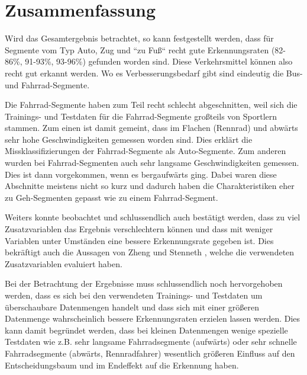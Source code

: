 \section{Zusammenfassung}
Wird das Gesamtergebnis betrachtet, so kann festgestellt werden, dass für Segmente vom Typ Auto, Zug und ``zu Fuß`` recht gute Erkennungsraten (82-86\%, 91-93\%, 93-96\%) gefunden worden sind. Diese Verkehrsmittel können also recht gut erkannt werden. Wo es Verbesserungsbedarf gibt sind eindeutig die Bus- und Fahrrad-Segmente.  

Die Fahrrad-Segmente haben zum Teil recht schlecht abgeschnitten, weil sich die Trainings- und Testdaten für die Fahrrad-Segmente großteils von Sportlern stammen. Zum einen ist damit gemeint, dass im Flachen (Rennrad) und abwärts sehr hohe Geschwindigkeiten gemessen worden sind. Dies erklärt die Missklassifizierungen der Fahrrad-Segmente als Auto-Segmente. Zum anderen wurden bei Fahrrad-Segmenten auch sehr langsame Geschwindigkeiten gemessen. Dies ist dann vorgekommen, wenn es bergaufwärts ging. Dabei waren diese Abschnitte meistens nicht so kurz und dadurch haben die Charakteristiken eher zu Geh-Segmenten gepasst wie zu einem Fahrrad-Segment.

Weiters konnte beobachtet und schlussendlich auch bestätigt werden, dass zu viel Zusatzvariablen das Ergebnis verschlechtern können und dass mit weniger Variablen unter Umständen eine bessere Erkennungsrate gegeben ist. Dies bekräftigt auch die Aussagen von Zheng \cite{zheng_understanding_2010} und Stenneth \cite{stenneth_transportation_2011}, welche die verwendeten Zusatzvariablen evaluiert haben. 

Bei der Betrachtung der Ergebnisse muss schlussendlich noch hervorgehoben werden, dass es sich bei den verwendeten Trainings- und Testdaten um überschaubare Datenmengen handelt und dass sich mit einer größeren Datenmenge wahrscheinlich bessere Erkennungsraten erzielen lassen werden. Dies kann damit begründet werden, dass bei kleinen Datenmengen wenige spezielle Testdaten wie z.B. sehr langsame Fahrradsegmente (aufwärts) oder sehr schnelle Fahrradsegmente (abwärts, Rennradfahrer) wesentlich größeren Einfluss auf den Entscheidungsbaum und im Endeffekt auf die Erkennung haben. 

